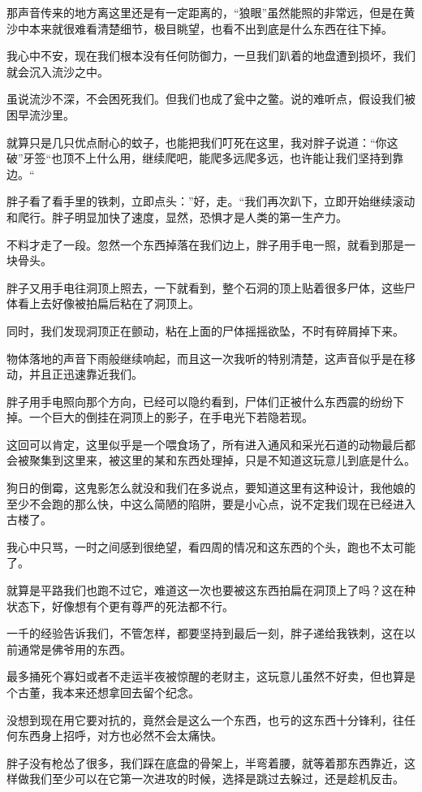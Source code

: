 那声音传来的地方离这里还是有一定距离的，“狼眼”虽然能照的非常远，但是在黄沙中本来就很难看清楚细节，极目眺望，也看不出到底是什么东西在往下掉。

我心中不安，现在我们根本没有任何防御力，一旦我们趴着的地盘遭到损坏，我们就会沉入流沙之中。

虽说流沙不深，不会困死我们。但我们也成了瓮中之鳖。说的难听点，假设我们被困早流沙里。

就算只是几只优点耐心的蚊子，也能把我们叮死在这里，我对胖子说道：“你这破”牙签“也顶不上什么用，继续爬吧，能爬多远爬多远，也许能让我们坚持到靠边。“

胖子看了看手里的铁刺，立即点头：”好，走。“我们再次趴下，立即开始继续滚动和爬行。胖子明显加快了速度，显然，恐惧才是人类的第一生产力。

不料才走了一段。忽然一个东西掉落在我们边上，胖子用手电一照，就看到那是一块骨头。

胖子又用手电往洞顶上照去，一下就看到，整个石洞的顶上贴着很多尸体，这些尸体看上去好像被拍扁后粘在了洞顶上。

同时，我们发现洞顶正在颤动，粘在上面的尸体摇摇欲坠，不时有碎屑掉下来。

物体落地的声音下雨般继续响起，而且这一次我听的特别清楚，这声音似乎是在移动，并且正迅速靠近我们。

胖子用手电照向那个方向，已经可以隐约看到，尸体们正被什么东西震的纷纷下掉。一个巨大的倒挂在洞顶上的影子，在手电光下若隐若现。

这回可以肯定，这里似乎是一个喂食场了，所有进入通风和采光石道的动物最后都会被聚集到这里来，被这里的某和东西处理掉，只是不知道这玩意儿到底是什么。

狗日的倒霉，这鬼影怎么就没和我们在多说点，要知道这里有这种设计，我他娘的至少不会跑的那么快，中这么简陋的陷阱，要是小心点，说不定我们现在已经进入古楼了。

我心中只骂，一时之间感到很绝望，看四周的情况和这东西的个头，跑也不太可能了。

就算是平路我们也跑不过它，难道这一次也要被这东西拍扁在洞顶上了吗？这在种状态下，好像想有个更有尊严的死法都不行。

一千的经验告诉我们，不管怎样，都要坚持到最后一刻，胖子递给我铁刺，这在以前通常是佛爷用的东西。

最多捅死个寡妇或者不走运半夜被惊醒的老财主，这玩意儿虽然不好卖，但也算是个古董，我本来还想拿回去留个纪念。

没想到现在用它要对抗的，竟然会是这么一个东西，也亏的这东西十分锋利，往任何东西身上招呼，对方也必然不会太痛快。

胖子没有枪怂了很多，我们踩在底盘的骨架上，半弯着腰，就等着那东西靠近，这样做我们至少可以在它第一次进攻的时候，选择是跳过去躲过，还是趁机反击。


